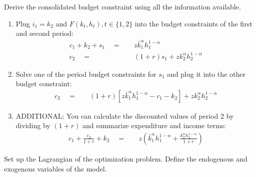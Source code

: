 \documentclass[a4paper, 12pt]{article}
\begin{document}
\begin{Exercise}%
	Derive the consolidated budget constraint using all the information available.%
\end{Exercise}%
\begin{Answer}%
	\begin{enumerate}
		\item Plug $i_1 = k_2$ and $F\left(k_t,h_t\right), t \in \{1,2\}$ into the budget constraints of the first and second period:
		\begin{align*}
			c_1 + k_2 + s_1 \quad = & \quad z \bar{k}_1^\alpha h_1^{1-\alpha} \\
			c_2 \quad = & \quad \left(1+r\right) s_1 + z k_2^\alpha h_2^{1-\alpha}
		\end{align*}
		\item Solve one of the period budget constraints for $s_1$ and plug it into the other budget constraint:
		\begin{align*}
			c_2 \quad = & \quad \left(1+r\right) \left[ z \bar{k}_1^\alpha h_1^{1-\alpha} - c_1 - k_2 \right] + z k_2^\alpha h_2^{1-\alpha}
		\end{align*}
		\item ADDITIONAL: You can calculate the discounted values of period 2 by dividing by $(1+r)$ and summarize expenditure and income terms:
		\begin{align*}
			c_1 + \frac{c_2}{1+r} + k_2 \quad = & \quad z \left(\bar{k}_1^\alpha h_1^{1-\alpha} + \frac{k_2^\alpha h_2^{1-\alpha}}{1+r} \right)
		\end{align*}
	\end{enumerate}
\end{Answer}%
\begin{Exercise}%
	Set up the Lagrangian of the optimization problem. Define the endogenous and exogenous variables of the model.%
\end{Exercise}%
\end{document}
